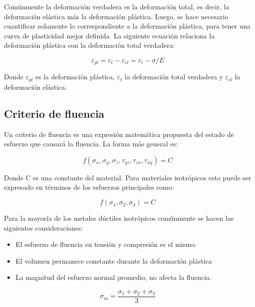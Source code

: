 Comúnmente la deformación verdadera es la deformación total, es decir, la deformación elástica más 
la deformación plástica. Luego, se hace necesario cuantificar solamente lo correspondiente a la 
deformación plástica, para tener una curva de plasticidad mejor definida. La siguiente ecuación 
relaciona la deformación plástica con la deformación total verdadera: ~\cite{abaqus-gs-manual}

\begin{equation} \label{eq:plastic_strain}
\varepsilon_{pl} = \varepsilon_t - \varepsilon_{el} = \varepsilon_t - \sigma/E
\end{equation}

Donde $\varepsilon_{pl}$ es la deformación plástica, $\varepsilon_t$ la deformación total verdadera y 
$\varepsilon_{el}$ la deformación elástica.


\subsection{Criterio de fluencia}

Un criterio de fluencia es una expresión matemática propuesta del estado de esfuerzo que causará 
la fluencia. La forma más general es: ~\cite{hosford2005}

\begin{equation}
f(\sigma_x,\sigma_y, \sigma_z, \tau_{yz}, \tau_{zx}, \tau_{xy} ) = C 
\end{equation}

Donde C es una constante del material. Para materiales isotrópicos esto puede ser expresado en 
términos de los esfuerzos principales como: ~\cite{hosford2005}

\begin{equation}
f(\sigma_1,\sigma_2,\sigma_3 )=C
\end{equation}

Para la mayoría de los metales dúctiles isotrópicos comúnmente se hacen las siguientes 
consideraciones: ~\cite{hosford2007}


\begin{itemize}
\item El esfuerzo de fluencia en tensión y compresión es el mismo.
\item El volumen permanece constante durante la deformación plástica
\item La magnitud del esfuerzo normal promedio, no afecta la fluencia.
\end{itemize}

\begin{equation}
\sigma_m=\frac{\sigma_1+\sigma_2+\sigma_3}{3}
\end{equation}

